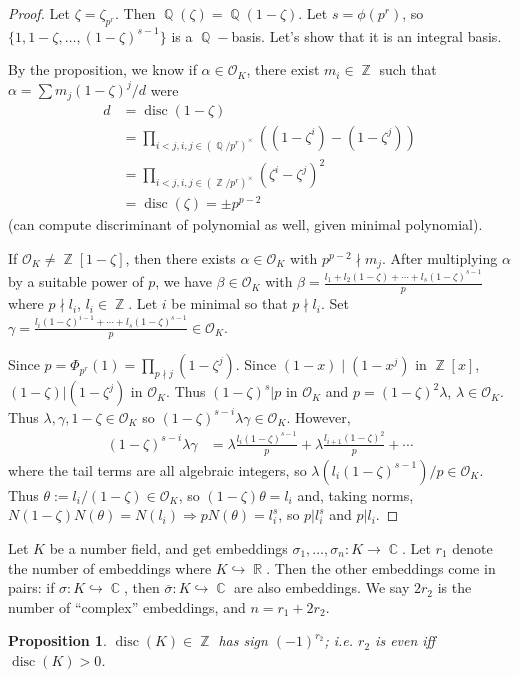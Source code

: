 \documentclass[11pt, a4paper]{memoir}
\DeclareMathOperator{\Q}{{\mathbb{Q}}}
\DeclareMathOperator{\Z}{{\mathbb{Z}}}
\DeclareMathOperator{\R}{{\mathbb{R}}}
\DeclareMathOperator{\C}{{\mathbb{C}}}
\theoremstyle{change}
\newtheorem{proposition}[theorem]{Proposition}
\theoremstyle{plain}
\theoremstyle{nonumberplain}
\newtheorem{proof}{Proof}
\DeclareMathOperator{\disc}{disc}
\begin{document}
\begin{proof}
    Let $\zeta=\zeta_{p^r}$.
    Then $\Q(\zeta)=\Q(1-\zeta)$.
    Let $s=\phi(p^r)$, so $\{1,1-\zeta,\ldots,(1-\zeta)^{s-1}\}$ is a $\Q-$basis.
    Let's show that it is an integral basis.

    By the proposition, we know if $\alpha\in\mathcal{O}_K$, there exist $m_i\in\Z$ such that $\alpha=\sum m_j(1-\zeta)^j/d$ were
    \begin{align*}
        d &= \disc(1-\zeta)\\
          &= \prod_{i<j,i,j\in(\Q/p^r)^\times}((1-\zeta^i)-(1-\zeta^j))\\
          &= \prod_{i<j,i,j\in(\Z/p^r)^\times}(\zeta^i-\zeta^j)^2\\
          &= \disc(\zeta)=\pm p^{p-2}
    \end{align*}
    (can compute discriminant of polynomial as well, given minimal polynomial).

    If $\mathcal{O}_K\neq\Z[1-\zeta]$, then there exists $\alpha\in\mathcal{O}_K$ with $p^{p-2}\nmid m_j$.
    After multiplying $\alpha$ by a suitable power of $p$, we have $\beta\in\mathcal{O}_K$ with $\beta=\frac{l_1+l_2(1-\zeta)+\cdots+l_s(1-\zeta)^{s-1}}{p}$ where $p\nmid l_i$, $l_i\in\Z$.
    Let $i$ be minimal so that $p\nmid l_i$.
    Set $\gamma=\frac{l_i(1-\zeta)^{i-1}+\cdots+l_s(1-\zeta)^{s-1}}{p}\in\mathcal{O}_K$.

    Since $p=\Phi_{p^r}(1)=\prod_{p\nmid j}(1-\zeta^j)$.
    Since $(1-x)\mid(1-x^j)$ in $\Z[x]$, $(1-\zeta)|(1-\zeta^j)$ in $\mathcal{O}_K$.
    Thus $(1-\zeta)^s|p$ in $\mathcal{O}_K$ and $p=(1-\zeta)^2\lambda$, $\lambda\in\mathcal{O}_K$.
    Thus $\lambda,\gamma,1-\zeta\in\mathcal{O}_K$ so $(1-\zeta)^{s-i}\lambda\gamma\in\mathcal{O}_K$.
    However,
    \begin{align*}
        (1-\zeta)^{s-i}\lambda\gamma &= \lambda\frac{l_i(1-\zeta)^{s-1}}{p}+\lambda\frac{l_{i+1}(1-\zeta)^2}{p}+\cdots
    \end{align*}
    where the tail terms are all algebraic integers, so $\lambda(l_i(1-\zeta)^{s-1})/p\in\mathcal{O}_K$.
    Thus $\theta:=l_i/(1-\zeta)\in\mathcal{O}_K$, so $(1-\zeta)\theta=l_i$ and, taking norms, $N(1-\zeta)N(\theta)=N(l_i)\Rightarrow pN(\theta)=l_i^s$, so $p|l_i^s$ and $p|l_i$.
\end{proof}
Let $K$ be a number field, and get embeddings $\sigma_1,\ldots,\sigma_n:K\to\C$.
Let $r_1$ denote the number of embeddings where $K\hookrightarrow\R$.
Then the other embeddings come in pairs: if $\sigma:K\hookrightarrow\C$, then $\overline{\sigma}:K\hookrightarrow\C$ are also embeddings.
We say $2r_2$ is the number of ``complex'' embeddings, and $n=r_1+2r_2$.
\begin{proposition}
    $\disc(K)\in\Z$ has sign $(-1)^{r_2}$; i.e. $r_2$ is even iff $\disc(K)>0$.
\end{proposition}
\end{document}
